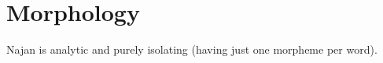 \section{Morphology} \label{sec:morphology}

Najan is analytic and purely isolating (having just one morpheme per word).
